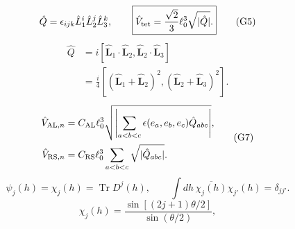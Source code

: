 \documentclass{article}
\newcommand{\Tr}{\operatorname{Tr}}
\begin{document}
\begin{equation}
\hat Q=\epsilon_{ijk}\hat L_1^i\hat L_2^j\hat L_3^k,\qquad\boxed{\hat V_{\rm tet}=\frac{\sqrt2}{3}\ell_0^3\sqrt{|\hat Q|}.}
\tag{G5}
\end{equation}
\begin{equation}
\begin{aligned}
\hat Q&=i[\hat{\mathbf L}_1\cdot\hat{\mathbf L}_2,\hat{\mathbf L}_2\cdot\hat{\mathbf L}_3]\\
&=\frac i4[(\hat{\mathbf L}_1+\hat{\mathbf L}_2)^2,(\hat{\mathbf L}_2+\hat{\mathbf L}_3)^2].
\end{aligned}
\tag{G6}
\end{equation}
\begin{equation}
\begin{aligned}
\hat V_{{\rm AL},n}&=C_{\rm AL}\ell_0^3\sqrt{\left|\sum_{a<b<c}\epsilon(e_a,e_b,e_c)\hat Q_{abc}\right|},\\
\hat V_{{\rm RS},n}&=C_{\rm RS}\ell_0^3\sum_{a<b<c}\sqrt{|\hat Q_{abc}|}.
\end{aligned}
\tag{G7}
\end{equation}
\begin{equation}
\psi_j(h)=\chi_j(h)=\Tr D^j(h),\qquad\int dh\,\overline{\chi_j(h)}\chi_{j'}(h)=\delta_{jj'}.
\tag{L1}
\end{equation}
\begin{equation}
\chi_j(h)=\frac{\sin[(2j+1)\theta/2]}{\sin(\theta/2)},
\tag{L2}
\end{equation}
\end{document}
